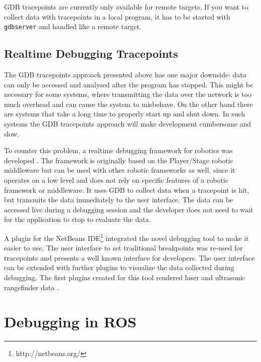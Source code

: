 GDB tracepoints are currently only available for remote targets. If you want to collect data with tracepoints in a local program, it has to be started with \verb+gdbserver+ and handled like a remote target.

\subsection{Realtime Debugging Tracepoints}
The GDB tracepoints approach presented above has one major downside: data can only be accessed and analysed after the program has stopped. This might be necessary for some systems, where transmitting the data over the network is too much overhead and can cause the system to misbehave. On the other hand there are systems that take a long time to properly start up and shut down. In such systems the GDB tracepoints approach will make development cumbersome and slow.

To counter this problem, a realtime debugging framework for robotics was developed \cite{Gumbley2009}. The framework is originally based on the Player/Stage robotic middleware but can be used with other robotic frameworks as well, since it operates on a low level and does not rely on specific features of a robotic framework or middleware. It uses GDB to collect data when a tracepoint is hit, but transmits the data immediately to the user interface. The data can be accessed live during a debugging session and the developer does not need to wait for the application to stop to evaluate the data.

A plugin for the NetBeans IDE\footnote{http://netbeans.org/} integrated the novel debugging tool to make it easier to use. The user interface to set traditional breakpoints was re-used for tracepoints and presents a well known interface for developers. The user interface can be extended with further plugins to visualize the data collected during debugging. The first plugins created for this tool rendered laser and ultrasonic rangefinder data \cite{Gumbley2009}.




\section{Debugging in ROS}
\label{debugging_ros}


